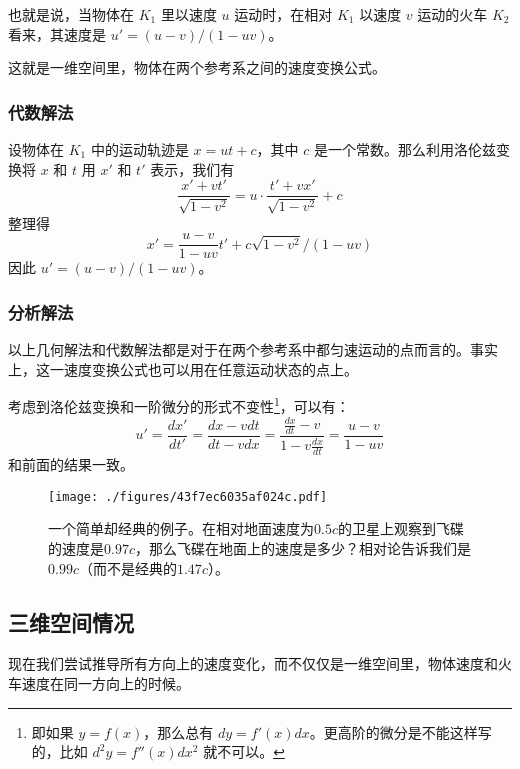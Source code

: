 也就是说，当物体在 $K_1$ 里以速度 $u$ 运动时，在相对 $K_1$ 以速度 $v$ 运动的火车 $K_2$ 看来，其速度是 $u'=(u-v)/(1-uv)$。

这就是一维空间里，物体在两个参考系之间的速度变换公式。

\subsubsection{代数解法}

设物体在 $K_1$ 中的运动轨迹是 $x=ut+c$，其中 $c$ 是一个常数。那么利用洛伦兹变换将 $x$ 和 $t$ 用 $x'$ 和 $t'$ 表示，我们有
\begin{equation}
\frac{x'+vt'}{\sqrt{1-v^2}}=u\cdot\frac{t'+vx'}{\sqrt{1-v^2}}+c
\end{equation}
整理得
\begin{equation}
x'=\frac{u-v}{1-uv}t'+c\sqrt{1-v^2}/(1-uv)
\end{equation}
因此 $u'=(u-v)/(1-uv)$。

\subsubsection{分析解法}

以上几何解法和代数解法都是对于在两个参考系中都匀速运动的点而言的。事实上，这一速度变换公式也可以用在任意运动状态的点上。

考虑到洛伦兹变换和一阶微分的形式不变性\footnote{即如果 $y=f(x)$，那么总有 $dy=f'(x)dx$。更高阶的微分是不能这样写的，比如 $d^2y=f''(x)dx^2$ 就不可以。}，可以有：
\begin{equation}
u'=\frac{dx'}{dt'}=\frac{dx-vdt}{dt-vdx}=\frac{\frac{dx}{dt}-v}{1-v\frac{dx}{dt}}=\frac{u-v}{1-uv}
\end{equation}
和前面的结果一致。

\begin{figure}[ht]
\centering
\texttt{[image: ./figures/43f7ec6035af024c.pdf]}
\caption{一个简单却经典的例子。在相对地面速度为$0.5c$的卫星上观察到飞碟的速度是$0.97c$，那么飞碟在地面上的速度是多少？相对论告诉我们是$0.99c$（而不是经典的$1.47c$）。} \label{fig_RelVel_2}
\end{figure}

\subsection{三维空间情况}

现在我们尝试推导所有方向上的速度变化，而不仅仅是一维空间里，物体速度和火车速度在同一方向上的时候。

